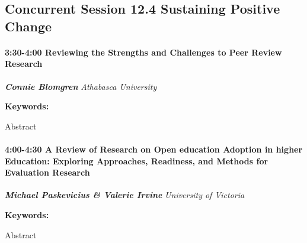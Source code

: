 \documentclass[
]{book}
\begin{document}
\hypertarget{concurrent-session-12.4-sustaining-positive-change}{%
\subsection*{Concurrent Session 12.4 \textbar{} Sustaining Positive Change}\label{concurrent-session-12.4-sustaining-positive-change}}

\begin{session}
\hypertarget{reviewing-the-strengths-and-challenges-to-peer-review-research}{%
\paragraph*{\texorpdfstring{3:30-4:00 \textbar{} \textbf{Reviewing the
Strengths and Challenges to Peer Review} \textbar{}
Research}{3:30-4:00 \textbar{} Reviewing the Strengths and Challenges to Peer Review \textbar{} Research}}\label{reviewing-the-strengths-and-challenges-to-peer-review-research}}

\textbf{\emph{Connie Blomgren}} \textbar{} \emph{Athabasca University}

\textbf{Keywords:}

Abstract
\end{session}

\begin{session}
\hypertarget{a-review-of-research-on-open-education-adoption-in-higher-education-exploring-approaches-readiness-and-methods-for-evaluation-research}{%
\paragraph*{\texorpdfstring{4:00-4:30 \textbar{} \textbf{A Review of
Research on Open education Adoption in higher Education: Exploring
Approaches, Readiness, and Methods for Evaluation} \textbar{}
Research}{4:00-4:30 \textbar{} A Review of Research on Open education Adoption in higher Education: Exploring Approaches, Readiness, and Methods for Evaluation \textbar{} Research}}\label{a-review-of-research-on-open-education-adoption-in-higher-education-exploring-approaches-readiness-and-methods-for-evaluation-research}}

\textbf{\emph{Michael Paskevicius \& Valerie Irvine}} \textbar{}
\emph{University of Victoria}

\textbf{Keywords:}

Abstract
\end{session}
\end{document}
